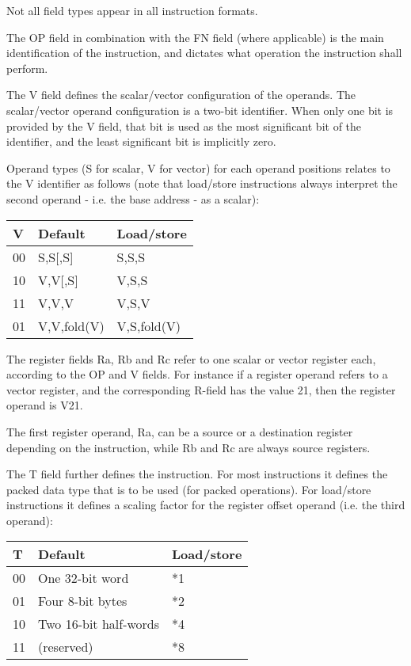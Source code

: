 Not all field types appear in all instruction formats.

The OP field in combination with the FN field (where applicable) is the main
identification of the instruction, and dictates what operation the instruction
shall perform.

The V field defines the scalar/vector configuration of the operands. The
scalar/vector operand configuration is a two-bit identifier. When only one bit
is provided by the V field, that bit is used as the most significant bit of the
identifier, and the least significant bit is implicitly zero.

Operand types (S for scalar, V for vector) for each operand positions relates
to the V identifier as follows (note that load/store instructions always
interpret the second operand - i.e. the base address - as a scalar):

\begin{tabular}{|l|l|l|}
  \hline
  \textbf{V} & \textbf{Default} & \textbf{Load/store} \\
  \hline
  00 & S,S[,S] & S,S,S \\
  \hline
  10 & V,V[,S] & V,S,S \\
  \hline
  11 & V,V,V & V,S,V \\
  \hline
  01 & V,V,fold(V) & V,S,fold(V) \\
  \hline
\end{tabular}

The register fields Ra, Rb and Rc refer to one scalar or vector register each,
according to the OP and V fields. For instance if a register operand refers to
a vector register, and the corresponding R-field has the value 21, then the
register operand is V21.

The first register operand, Ra, can be a source or a destination register
depending on the instruction, while Rb and Rc are always source registers.

The T field further defines the instruction. For most instructions it defines
the packed data type that is to be used (for packed operations). For load/store
instructions it defines a scaling factor for the register offset operand (i.e.
the third operand):

\begin{tabular}{|l|l|l|}
  \hline
  \textbf{T} & \textbf{Default} & \textbf{Load/store} \\
  \hline
  00 & One 32-bit word & *1 \\
  \hline
  01 & Four 8-bit bytes & *2 \\
  \hline
  10 & Two 16-bit half-words & *4 \\
  \hline
  11 & (reserved) & *8 \\
  \hline
\end{tabular}

